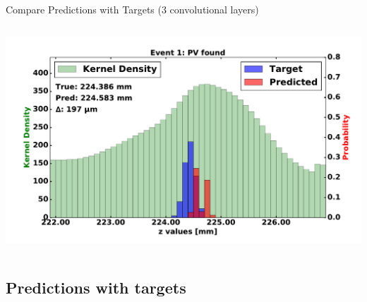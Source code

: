 \begin{frame}{Compare Predictions with Targets (3 convolutional layers)}
\begin{columns}[c]
\begin{center}
           \includegraphics[width=1\textwidth, height=0.45\textwidth, trim=18 0 18 0]{images/120000_3layer_11.pdf}
       \end{center}
  \end{columns}
\end{frame}

\subsection{Predictions with targets}

